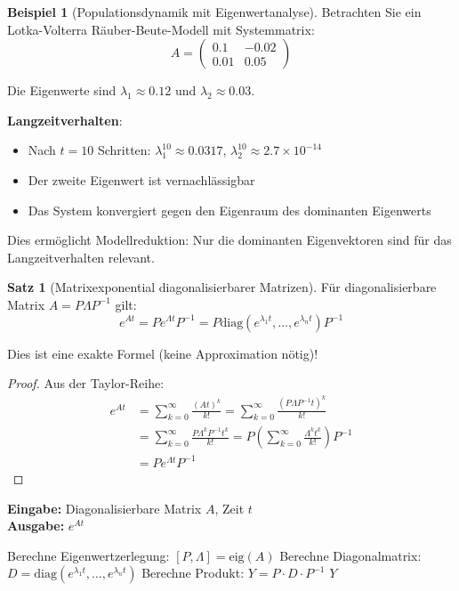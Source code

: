 \documentclass[a4paper,12pt]{report}
\theoremstyle{definition}
\newtheorem{beispiel}{Beispiel}
\newtheorem{satz}{Satz}
\begin{document}
	\begin{beispiel}[Populationsdynamik mit Eigenwertanalyse]
		Betrachten Sie ein Lotka-Volterra Räuber-Beute-Modell mit Systemmatrix:
		\[
		A = \begin{pmatrix}
			0.1 & -0.02 \\
			0.01 & 0.05
		\end{pmatrix}
		\]
		
		Die Eigenwerte sind $\lambda_1 \approx 0.12$ und $\lambda_2 \approx 0.03$.
		
		\textbf{Langzeitverhalten}:
		\begin{itemize}
			\item Nach $t = 10$ Schritten: $\lambda_1^{10} \approx 0.0317$, $\lambda_2^{10} \approx 2.7 \times 10^{-14}$
			\item Der zweite Eigenwert ist vernachlässigbar
			\item Das System konvergiert gegen den Eigenraum des dominanten Eigenwerts
		\end{itemize}
		
		Dies ermöglicht Modellreduktion: Nur die dominanten Eigenvektoren sind für das Langzeitverhalten relevant.
	\end{beispiel}
	
	\begin{satz}[Matrixexponential diagonalisierbarer Matrizen]
		Für diagonalisierbare Matrix $A = P \Lambda P^{-1}$ gilt:
		\[
		e^{At} = P e^{\Lambda t} P^{-1} = P \text{diag}(e^{\lambda_1 t}, \ldots, e^{\lambda_n t}) P^{-1}
		\]
		
		Dies ist eine exakte Formel (keine Approximation nötig)!
	\end{satz}
	
	\begin{proof}
		Aus der Taylor-Reihe:
		\begin{align}
			e^{At} &= \sum_{k=0}^{\infty} \frac{(At)^k}{k!} = \sum_{k=0}^{\infty} \frac{(P \Lambda P^{-1} t)^k}{k!} \\
			&= \sum_{k=0}^{\infty} \frac{P \Lambda^k P^{-1} t^k}{k!} = P \left(\sum_{k=0}^{\infty} \frac{\Lambda^k t^k}{k!}\right) P^{-1} \\
			&= P e^{\Lambda t} P^{-1}
		\end{align}
	\end{proof}
	
	\begin{algorithm}[H]
		\caption{Matrixexponential via Eigenwertzerlegung}
		\label{alg:matrix-exp-eigenvalue}
		\textbf{Eingabe:} Diagonalisierbare Matrix $A$, Zeit $t$ \\
		\textbf{Ausgabe:} $e^{At}$
		\begin{algorithmic}[1]
			\State Berechne Eigenwertzerlegung: $[P, \Lambda] = \text{eig}(A)$
			\State Berechne Diagonalmatrix: $D = \text{diag}(e^{\lambda_1 t}, \ldots, e^{\lambda_n t})$
			\State Berechne Produkt: $Y = P \cdot D \cdot P^{-1}$
			\State \Return $Y$
		\end{algorithmic}
	\end{algorithm}
\end{document}
